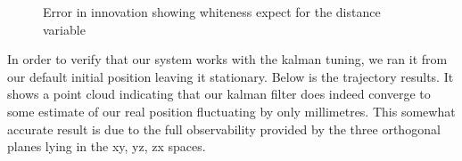 \documentclass[]{article}
\begin{document}
{\begin{figure}[H]
	\centering     %
	\;
	\;
	\;
	\;
	\caption{Error in innovation showing whiteness expect for the distance variable}
	\label{fig:errorfigures}
\end{figure}


In order to verify that our system works with the kalman tuning, we ran it from our default initial position leaving it stationary. Below is the trajectory results. It shows a point cloud indicating that our kalman filter does indeed converge to some estimate of our real position fluctuating by only millimetres. This  somewhat accurate result is due to the full observability provided by the three orthogonal planes lying in the xy, yz, zx spaces.

}
\end{document}

